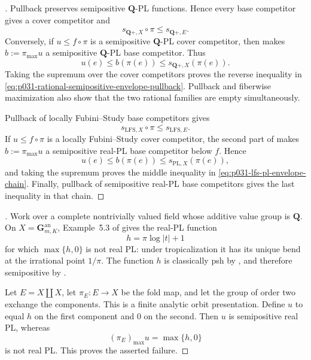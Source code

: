 \begin{proof}[]
Pullback preserves semipositive $\mathbf Q$-PL functions.  Hence every
base competitor gives a cover competitor and
\[
                  s_{\mathbf Q+,X}\circ\pi
                         \leq s_{\mathbf Q+,E}.
\]
Conversely, if $u\leq f\circ\pi$ is a semipositive $\mathbf Q$-PL cover
competitor, then  makes
$b:=\pi_{\max}u$ a semipositive $\mathbf Q$-PL base competitor.  Thus
\[
          u(e)\leq b(\pi(e))
              \leq s_{\mathbf Q+,X}(\pi(e)).
\]
Taking the supremum over the cover competitors proves the reverse
inequality in
\eqref{eq:p031-rational-semipositive-envelope-pullback}.  Pullback and
fiberwise maximization also show that the two rational families are empty
simultaneously.

Pullback of locally Fubini--Study base competitors gives
\[
                 s_{\mathrm{LFS},X}\circ\pi
                        \leq s_{\mathrm{LFS},E}.
\]
If $u\leq f\circ\pi$ is a locally Fubini--Study cover competitor, the
second part of  makes
$b:=\pi_{\max}u$ a semipositive real-PL base competitor below $f$.  Hence
\[
          u(e)\leq b(\pi(e))
              \leq s_{\mathrm{PL},X}(\pi(e)),
\]
and taking the supremum proves the middle inequality in
\eqref{eq:p031-lfs-pl-envelope-chain}.  Finally, pullback of semipositive
real-PL base competitors gives the last inequality in that chain.
\end{proof}

\begin{proof}[]
Work over a complete nontrivially valued field whose additive value group
is $\mathbf Q$.  On $X=\mathbf G_{m,K}^{\mathrm{an}}$, Example~5.3 of
\cite{GJR26} gives the real-PL function
\[
                         h=\pi\log|t|+1
\]
for which $\max\{h,0\}$ is not real PL: under tropicalization it has its
unique bend at the irrational point $1/\pi$.  The function $h$ is
classically psh by \cite[Proposition~4.2\textup{(2),(3)}]{GR25Classical},
and therefore semipositive by \cite[Theorem~4.3]{GR25Classical}.

Let $E=X\amalg X$, let $\pi_E:E\to X$ be the fold map, and let the group
of order two exchange the components.  This is a finite analytic orbit
presentation.  Define $u$ to equal $h$ on the first component and $0$ on
the second.  Then $u$ is semipositive real PL, whereas
\[
                         (\pi_E)_{\max}u=\max\{h,0\}
\]
is not real PL.  This proves the asserted failure.
\end{proof}
